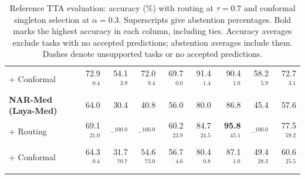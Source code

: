 \begin{table}[t]
\begin{tabular*}{\textwidth}{@{\extracolsep{\fill}}lrrrrrrrr@{}}
\quad + Conformal & 72.9$^{0.4}$ & 54.1$^{3.9}$ & 72.0$^{9.4}$ & 69.7$^{0.0}$ & 91.4$^{1.4}$ & 90.4$^{1.0}$ & 58.2$^{5.9}$ & 72.7$^{3.1}$ \\
\addlinespace[3pt]
\textbf{NAR-Med (Laya-Med)} & 64.0 & 30.4 & 40.8 & 56.0 & 80.0 & 86.8 & 45.4 & 57.6 \\
\quad + Routing & 69.1$^{21.0}$ & --$^{100.0}$ & --$^{100.0}$ & 60.2$^{23.9}$ & 84.7$^{24.5}$ & \textbf{95.8}$^{45.1}$ & --$^{100.0}$ & 77.5$^{59.2}$ \\
\quad + Conformal & 64.3$^{0.4}$ & 31.7$^{70.7}$ & 54.6$^{73.0}$ & 56.7$^{4.6}$ & 80.4$^{0.8}$ & 87.1$^{1.0}$ & 49.4$^{28.3}$ & 60.6$^{25.5}$ \\
\addlinespace[3pt]
\bottomrule
\end{tabular*}
\caption{Reference TTA evaluation: accuracy (\%) with routing at $\tau=0.7$ and conformal singleton selection at $\alpha=0.3$. Superscripts give abstention percentages. Bold marks the highest accuracy in each column, including ties. Accuracy averages exclude tasks with no accepted predictions; abstention averages include them. Dashes denote unsupported tasks or no accepted predictions.}
\label{tab:tta_accuracy_abstention}
\end{table}
